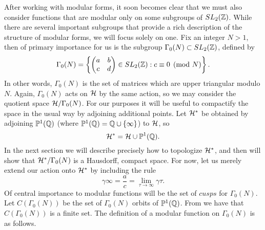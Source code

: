After working with modular forms, it soon becomes clear that we must also consider functions that are modular only on some subgroups of $SL_2(\mathbb{Z})$. While there are several important subgroups that provide a rich description of the structure of modular forms, we will focus solely on one. Fix an integer $N > 1$, then of primary importance for us is the subgroup $\Gamma_0(N) \subset SL_2(\mathbb{Z})$, defined by
$$\Gamma_0(N) = \left\{\begin{pmatrix} a & b \\  c & d \end{pmatrix} \in SL_2(\mathbb{Z}) : c \equiv 0\pmod N \right\}.$$
In other words, $\Gamma_0(N)$ is the set of matrices which are upper triangular modulo $N$. Again, $\Gamma_0(N)$ acts on $\mathcal{H}$ by the same action, so we may consider the quotient space $\mathcal{H}/\Gamma_0(N)$. For our purposes it will be useful to compactify the space in the usual way by adjoining additional points. Let $\mathcal{H}^*$ be obtained by adjoining $\mathbb{P}^1(\mathbb{Q})$ (where $\mathbb{P}^1(\mathbb{Q}) = \mathbb{Q} \cup \{\infty\}$) to $\mathcal{H}$, so
$$\mathcal{H}^* = \mathcal{H} \cup \mathbb{P}^1(\mathbb{Q}).$$
In the next section we will describe precisely how to topologize $\mathcal{H}^*$, and then will show that $\mathcal{H}^*/\Gamma_0(N)$ is a Hausdorff, compact space. For now, let us merely extend our action onto $\mathcal{H}^*$ by including the rule
$$\gamma\infty =\frac{a}{c} = \lim_{\tau \to \infty} \gamma\tau.$$
Of central importance to modular functions will be the set of $cusps$ for $\Gamma_0(N)$. Let $C(\Gamma_0(N))$ be the set of $\Gamma_0(N)$ orbits of $\mathbb{P}^1(\mathbb{Q})$. From \cite[Lemma 1.12]{Stein} we have that $C(\Gamma_0(N))$ is a finite set. The definition of a modular function on $\Gamma_0(N)$ is as follows.

